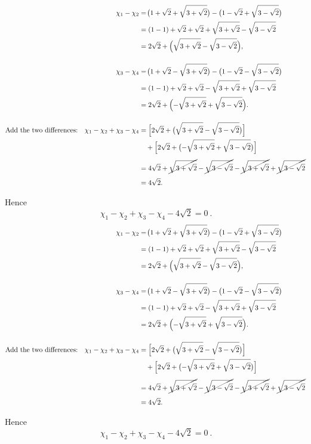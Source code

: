 \documentclass[12pt]{article}
\title{}
\author{Jerich Lee}
\date{\today}
\theoremstyle{definition} %
\theoremstyle{plain} %
\begin{document}
\maketitle
\[
\begin{aligned}
\chi_1-\chi_2
  &=\!\bigl(1+\sqrt{2}+\sqrt{3+\sqrt2}\bigr)
    -\bigl(1-\sqrt{2}+\sqrt{3-\sqrt2}\bigr) \\[2pt]
  &= (1-1) + \sqrt2 + \sqrt2
     +\sqrt{3+\sqrt2}-\sqrt{3-\sqrt2}\\[2pt]
  &= 2\sqrt2 + \Bigl(\sqrt{3+\sqrt2}-\sqrt{3-\sqrt2}\Bigr),
\\[12pt]
\chi_3-\chi_4
  &=\!\bigl(1+\sqrt{2}-\sqrt{3+\sqrt2}\bigr)
    -\bigl(1-\sqrt{2}-\sqrt{3-\sqrt2}\bigr) \\[2pt]
  &= (1-1) + \sqrt2 + \sqrt2
     -\sqrt{3+\sqrt2}+\sqrt{3-\sqrt2}\\[2pt]
  &= 2\sqrt2 + \Bigl(-\sqrt{3+\sqrt2}+\sqrt{3-\sqrt2}\Bigr).
\\[12pt]
\text{Add the two differences:}\quad
\chi_1-\chi_2+\chi_3-\chi_4
  &=\Bigl[2\sqrt2+\bigl(\sqrt{3+\sqrt2}-\sqrt{3-\sqrt2}\bigr)\Bigr] \\
  &\quad+\Bigl[2\sqrt2+\bigl(-\sqrt{3+\sqrt2}+\sqrt{3-\sqrt2}\bigr)\Bigr]\\[4pt]
  &= 4\sqrt2
    +\cancel{\sqrt{3+\sqrt2}}
    -\cancel{\sqrt{3-\sqrt2}}
    -\cancel{\sqrt{3+\sqrt2}}
    +\cancel{\sqrt{3-\sqrt2}}\\[4pt]
  &= 4\sqrt2.
\end{aligned}
\]

Hence
\[
\boxed{\ \chi_{1}-\chi_{2}+\chi_{3}-\chi_{4}-4\sqrt2 = 0\ }.
\]\[
  \begin{aligned}
  \chi_1-\chi_2
    &=\!\bigl(1+\sqrt{2}+\sqrt{3+\sqrt2}\bigr)
      -\bigl(1-\sqrt{2}+\sqrt{3-\sqrt2}\bigr) \\[2pt]
    &= (1-1) + \sqrt2 + \sqrt2
       +\sqrt{3+\sqrt2}-\sqrt{3-\sqrt2}\\[2pt]
    &= 2\sqrt2 + \Bigl(\sqrt{3+\sqrt2}-\sqrt{3-\sqrt2}\Bigr),
  \\[12pt]
  \chi_3-\chi_4
    &=\!\bigl(1+\sqrt{2}-\sqrt{3+\sqrt2}\bigr)
      -\bigl(1-\sqrt{2}-\sqrt{3-\sqrt2}\bigr) \\[2pt]
    &= (1-1) + \sqrt2 + \sqrt2
       -\sqrt{3+\sqrt2}+\sqrt{3-\sqrt2}\\[2pt]
    &= 2\sqrt2 + \Bigl(-\sqrt{3+\sqrt2}+\sqrt{3-\sqrt2}\Bigr).
  \\[12pt]
  \text{Add the two differences:}\quad
  \chi_1-\chi_2+\chi_3-\chi_4
    &=\Bigl[2\sqrt2+\bigl(\sqrt{3+\sqrt2}-\sqrt{3-\sqrt2}\bigr)\Bigr] \\
    &\quad+\Bigl[2\sqrt2+\bigl(-\sqrt{3+\sqrt2}+\sqrt{3-\sqrt2}\bigr)\Bigr]\\[4pt]
    &= 4\sqrt2
      +\cancel{\sqrt{3+\sqrt2}}
      -\cancel{\sqrt{3-\sqrt2}}
      -\cancel{\sqrt{3+\sqrt2}}
      +\cancel{\sqrt{3-\sqrt2}}\\[4pt]
    &= 4\sqrt2.
  \end{aligned}
  \]
  
  Hence
  \[
  \boxed{\ \chi_{1}-\chi_{2}+\chi_{3}-\chi_{4}-4\sqrt2 = 0\ }.
  \]
\end{document}
